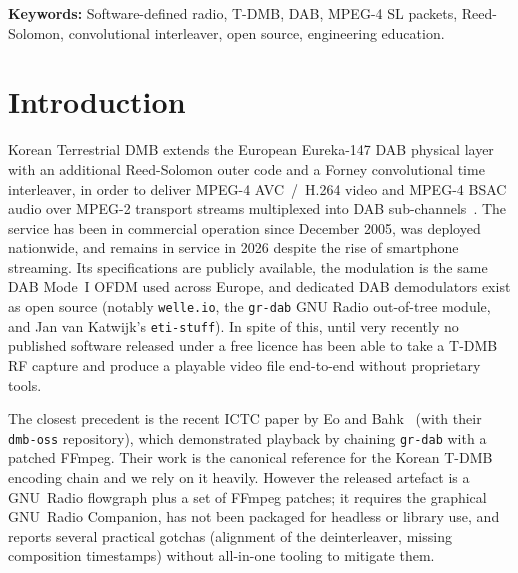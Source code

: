 \documentclass[11pt,a4paper]{article}
\begin{document}
\noindent\textbf{Keywords:}
Software-defined radio, T-DMB, DAB, MPEG-4 SL packets, Reed-Solomon,
convolutional interleaver, open source, engineering education.

\section{Introduction}\label{sec:intro}

Korean Terrestrial DMB extends the European Eureka-147 DAB physical
layer~\cite{etsi300401} with an additional Reed-Solomon outer code and a
Forney convolutional time interleaver, in order to deliver MPEG-4
AVC~/~H.264 video and MPEG-4 BSAC audio over MPEG-2 transport streams
multiplexed into DAB sub-channels~\cite{ttak0026,etsi102427,etsi102428}.
The service has been in commercial operation since December 2005, was
deployed nationwide, and remains in service in 2026 despite the rise of
smartphone streaming.  Its specifications are publicly available, the
modulation is the same DAB Mode~I OFDM used across Europe, and dedicated
DAB demodulators exist as open source (notably \texttt{welle.io}, the
\texttt{gr-dab} GNU Radio out-of-tree module, and Jan van Katwijk's
\texttt{eti-stuff}).  In spite of this, until very recently no published
software released under a free licence has been able to take a T-DMB RF
capture and produce a playable video file end-to-end without proprietary
tools.

The closest precedent is the recent ICTC paper by
Eo and Bahk~\cite{eo2024tdmb} (with their \texttt{dmb-oss} repository),
which demonstrated playback by chaining \texttt{gr-dab} with a patched
FFmpeg.  Their work is the canonical reference for the Korean T-DMB
encoding chain and we rely on it heavily.  However the released artefact
is a GNU~Radio flowgraph plus a set of FFmpeg patches; it requires the
graphical GNU~Radio Companion, has not been packaged for headless or
library use, and reports several practical gotchas (alignment of the
deinterleaver, missing composition timestamps) without
all-in-one tooling to mitigate them.
\end{document}
